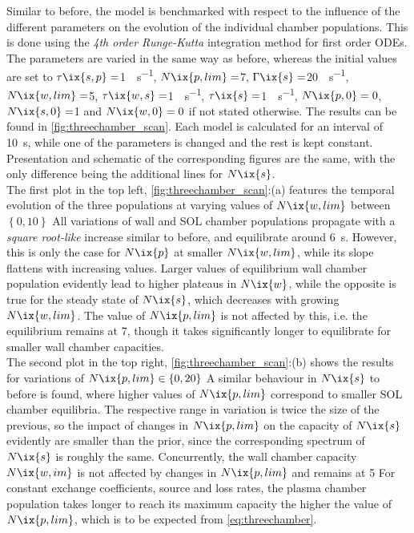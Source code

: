             Similar to before, the model is benchmarked with respect to the influence of the different parameters on the evolution of the individual chamber populations. This is done using the \textit{4th order Runge-Kutta} integration method for first order ODEs. The parameters are varied in the same way as before, whereas the initial values are set to $\tau\ix{s,p}=$\SI{1}{\arbitraryunit\per\second}, $N\ix{p,lim}=$\SI{7}{\arbitraryunit}, $\Gamma\ix{s}=$\SI{20}{\arbitraryunit\per\second}, $N\ix{w,lim}=$\SI{5}{\arbitraryunit}, $\tau\ix{w,s}=$\SI{1}{\arbitraryunit\per\second}, $\tau\ix{s}=$\SI{1}{\arbitraryunit\per\second}, $N\ix{p,0}=0$, $N\ix{s,0}=$\SI{1}{\arbitraryunit} and $N\ix{w,0}=0$ if not stated otherwise. The results can be found in \cref{fig:threechamber_scan}. Each model is calculated for an interval of \SI{10}{\second}, while one of the parameters is changed and the rest is kept constant. Presentation and schematic of the corresponding figures are the same, with the only difference being the additional lines for $N\ix{s}$.\\%
            The first plot in the top left, \cref{fig:threechamber_scan}:(a) features the temporal evolution of the three populations at varying values of $N\ix{w,lim}$ between $\left\{0, 10\right\}$\SI{}{\arbitraryunit} All variations of wall and SOL chamber populations propagate with a \textit{square root-like} increase similar to before, and equilibrate around \SI{6}{\second}. However, this is only the case for $N\ix{p}$ at smaller $N\ix{w,lim}$, while its slope flattens with increasing values. Larger values of equilibrium wall chamber population evidently lead to higher plateaus in $N\ix{w}$, while the opposite is true for the steady state of $N\ix{s}$, which decreases with growing $N\ix{w,lim}$. The value of $N\ix{p,lim}$ is not affected by this, i.e. the equilibrium remains at \SI{7}{\arbitraryunit}, though it takes significantly longer to equilibrate for smaller wall chamber capacities.\\%
            The second plot in the top right, \cref{fig:threechamber_scan}:(b) shows the results for variations of $N\ix{p,lim}\in\left\{0, 20\right\}$\SI{}{\arbitraryunit} A similar behaviour in $N\ix{s}$ to before is found, where higher values of $N\ix{p,lim}$ correspond to smaller SOL chamber equilibria. The respective range in variation is twice the size of the previous, so the impact of changes in $N\ix{p,lim}$ on the capacity of $N\ix{s}$ evidently are smaller than the prior, since the corresponding spectrum of $N\ix{s}$ is roughly the same. Concurrently, the wall chamber capacity $N\ix{w,im}$ is not affected by changes in $N\ix{p,lim}$ and remains at \SI{5}{\arbitraryunit} For constant exchange coefficients, source and loss rates, the plasma chamber population takes longer to reach its maximum capacity the higher the value of $N\ix{p,lim}$, which is to be expected from \cref{eq:threechamber}.\\%
